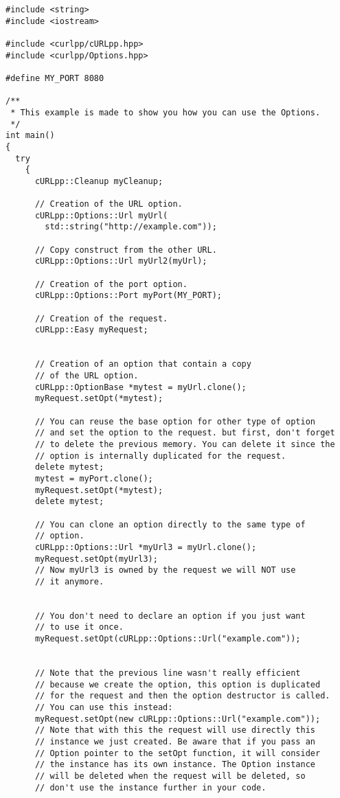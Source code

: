 \documentclass{article}
\begin{document}
\begin{verbatim}
#include <string>
#include <iostream>

#include <curlpp/cURLpp.hpp>
#include <curlpp/Options.hpp>

#define MY_PORT 8080

/** 
 * This example is made to show you how you can use the Options.
 */
int main()
{
  try
    {
      cURLpp::Cleanup myCleanup;

      // Creation of the URL option.
      cURLpp::Options::Url myUrl(
        std::string("http://example.com"));
      
      // Copy construct from the other URL.
      cURLpp::Options::Url myUrl2(myUrl);

      // Creation of the port option.
      cURLpp::Options::Port myPort(MY_PORT);

      // Creation of the request.
      cURLpp::Easy myRequest;


      // Creation of an option that contain a copy 
      // of the URL option.
      cURLpp::OptionBase *mytest = myUrl.clone();
      myRequest.setOpt(*mytest);

      // You can reuse the base option for other type of option
      // and set the option to the request. but first, don't forget 
      // to delete the previous memory. You can delete it since the 
      // option is internally duplicated for the request.
      delete mytest;
      mytest = myPort.clone();
      myRequest.setOpt(*mytest);
      delete mytest;

      // You can clone an option directly to the same type of 
      // option.
      cURLpp::Options::Url *myUrl3 = myUrl.clone();
      myRequest.setOpt(myUrl3);
      // Now myUrl3 is owned by the request we will NOT use 
      // it anymore.


      // You don't need to declare an option if you just want 
      // to use it once.
      myRequest.setOpt(cURLpp::Options::Url("example.com"));


      // Note that the previous line wasn't really efficient
      // because we create the option, this option is duplicated
      // for the request and then the option destructor is called.
      // You can use this instead:
      myRequest.setOpt(new cURLpp::Options::Url("example.com"));
      // Note that with this the request will use directly this
      // instance we just created. Be aware that if you pass an
      // Option pointer to the setOpt function, it will consider
      // the instance has its own instance. The Option instance
      // will be deleted when the request will be deleted, so
      // don't use the instance further in your code.



\end{verbatim}
\end{document}
